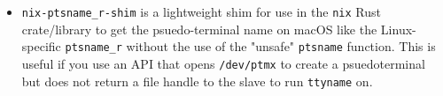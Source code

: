 \documentclass[10pt,letter,ragged2e]{altacv}
\begin{document}
\begin{paracol}{2}



\divider


\begin{itemize}
\item \texttt{nix-ptsname\_r-shim} is a lightweight shim for use in the \texttt{nix} Rust crate/library to get the psuedo-terminal name on macOS like  the Linux-specific \texttt{ptsname\_r} without the use of the "unsafe" \texttt{ptsname} function. This is useful if you use an API that opens \texttt{/dev/ptmx} to create a psuedoterminal but does not return a file handle to the slave to run \texttt{ttyname} on.
\end{itemize}







\end{paracol}
\end{document}
